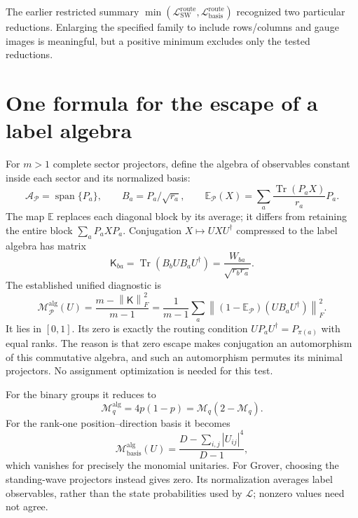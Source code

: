 \documentclass[11pt,a4paper,oneside]{report}
\newcommand{\Tr}{\operatorname{Tr}}
\newcommand{\spanof}{\operatorname{span}}
\newcommand{\norm}[1]{\left\lVert#1\right\rVert}
\newcommand{\sw}{\mathrm{SW}}
\numberwithin{equation}{chapter}
\begin{document}
The earlier restricted summary
\(\min(\mathcal L_{\sw}^{\mathrm{route}},
\mathcal L_{\mathrm{basis}}^{\mathrm{route}})\)
recognized two particular reductions. Enlarging the specified family
to include rows/columns and gauge images is meaningful, but a positive
minimum excludes only the tested reductions.

\section{One formula for the escape of a label algebra}

For \(m>1\) complete sector projectors, define the algebra of
observables constant inside each sector and its normalized basis:
\begin{equation}
\mathcal A_{\mathscr P}=\spanof\{P_a\},\qquad
B_a=P_a/\sqrt{r_a},\qquad
\mathbb E_{\mathscr P}(X)=\sum_a\frac{\Tr(P_aX)}{r_a}P_a.
\end{equation}
The map \(\mathbb E\) replaces each diagonal block by its average;
it differs from retaining the entire block \(\sum_aP_aXP_a\).
Conjugation \(X\mapsto UXU^\dagger\) compressed to the label algebra
has matrix
\begin{equation}
\mathsf K_{ba}=\Tr(B_bUB_aU^\dagger)
=\frac{W_{ba}}{\sqrt{r_br_a}}.
\end{equation}
The established unified diagnostic is
\begin{equation}
\boxed{
\mathcal M^{\mathrm{alg}}_{\mathscr P}(U)
=\frac{m-\norm{\mathsf K}_F^2}{m-1}
=\frac1{m-1}\sum_a
\norm{(1-\mathbb E_{\mathscr P})(UB_aU^\dagger)}_F^2.
}
\end{equation}
It lies in \([0,1]\). Its zero is exactly the routing condition
\(UP_aU^\dagger=P_{\pi(a)}\) with equal ranks. The reason is that
zero escape makes conjugation an automorphism of this commutative
algebra, and such an automorphism permutes its minimal projectors.
No assignment optimization is needed for this test.

For the binary groups it reduces to
\begin{equation}
\mathcal M_q^{\mathrm{alg}}=4p(1-p)
=\mathcal M_q(2-\mathcal M_q).
\end{equation}
For the rank-one position--direction basis it becomes
\begin{equation}
\mathcal M^{\mathrm{alg}}_{\mathrm{basis}}(U)
=\frac{D-\sum_{i,j}|U_{ij}|^4}{D-1},
\end{equation}
which vanishes for precisely the monomial unitaries. For Grover,
choosing the standing-wave projectors instead gives zero. Its
normalization averages label observables, rather than the state
probabilities used by \(\mathcal L\); nonzero values need not agree.
\end{document}
